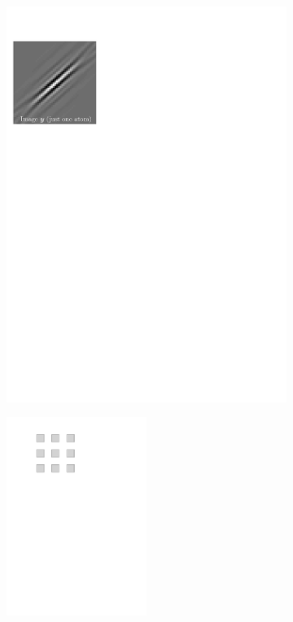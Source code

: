 \begin{figure}[!ht]\centering
\begin{subfigure}[b]{0.32\textwidth}\centering
	\includegraphics[width=\textwidth]{figures/manual-better-support/target.pdf}
	\caption{}
\end{subfigure}
\begin{subfigure}[b]{0.32\textwidth}\centering
	\includegraphics[width=0.5\textwidth]{figures/manual-better-support/support.pdf}

\end{subfigure}
\end{figure}
